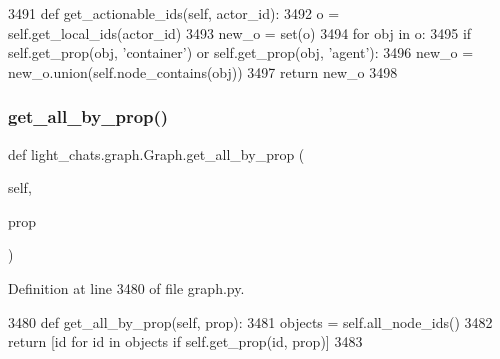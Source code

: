 \begin{DoxyCode}
3491     \textcolor{keyword}{def }get\_actionable\_ids(self, actor\_id):
3492         o = self.get\_local\_ids(actor\_id)
3493         new\_o = set(o)
3494         \textcolor{keywordflow}{for} obj \textcolor{keywordflow}{in} o:
3495             \textcolor{keywordflow}{if} self.get\_prop(obj, \textcolor{stringliteral}{'container'}) \textcolor{keywordflow}{or} self.get\_prop(obj, \textcolor{stringliteral}{'agent'}):
3496                 new\_o = new\_o.union(self.node\_contains(obj))
3497         \textcolor{keywordflow}{return} new\_o
3498 
\end{DoxyCode}
\mbox{\label{classlight__chats_1_1graph_1_1Graph_a4d86c4e411c724a8e169060335314d90}} 
\subsubsection{\texorpdfstring{get\+\_\+all\+\_\+by\+\_\+prop()}{get\_all\_by\_prop()}}
{\footnotesize\ttfamily def light\+\_\+chats.\+graph.\+Graph.\+get\+\_\+all\+\_\+by\+\_\+prop (\begin{DoxyParamCaption}\item[{}]{self,  }\item[{}]{prop }\end{DoxyParamCaption})}



Definition at line 3480 of file graph.\+py.


\begin{DoxyCode}
3480     \textcolor{keyword}{def }get\_all\_by\_prop(self, prop):
3481         objects = self.all\_node\_ids()
3482         \textcolor{keywordflow}{return} [id \textcolor{keywordflow}{for} id \textcolor{keywordflow}{in} objects \textcolor{keywordflow}{if} self.get\_prop(id, prop)]
3483 
\end{DoxyCode}
\mbox{\label{classlight__chats_1_1graph_1_1Graph_a33e205ecb0e7d4d2626162250ef585f1}} 
